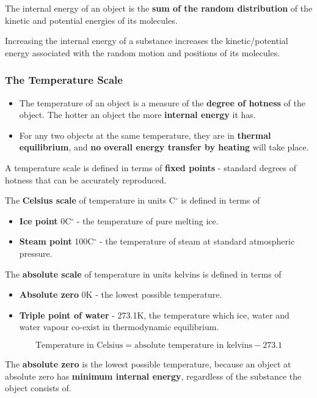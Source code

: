 The internal energy of an object is the \textbf{sum of the random distribution} of the kinetic and potential energies of its molecules.

Increasing the internal energy of a substance increases the kinetic/potential energy associated with the random motion and positions of its molecules.

\subsubsection*{The Temperature Scale}

\begin{itemize}
    \item The temperature of an object is a measure of the \textbf{degree of hotness} of the object. The hotter an object the more \textbf{internal energy} it has.
    \item For any two objects at the same temperature, they are in \textbf{thermal equilibrium}, and \textbf{no overall energy transfer by heating} will take place.
\end{itemize}

A temperature scale is defined in terms of \textbf{fixed points} - standard degrees of hotness that can be accurately reproduced.

The \textbf{Celsius scale} of temperature in units C$^\circ$ is defined in terms of
\begin{itemize}
    \item \textbf{Ice point} 0C$^\circ$ - the temperature of pure melting ice.
    \item \textbf{Steam point} 100C$^\circ$ - the temperature of steam at standard atmospheric pressure.
\end{itemize}

The \textbf{absolute scale} of temperature in units kelvins is defined in terms of
\begin{itemize}
    \item \textbf{Absolute zero} 0K - the lowest possible temperature.
    \item \textbf{Triple point of water} - 273.1K, the temperature which ice, water and water vapour co-exist in thermodynamic equilibrium.
\end{itemize}
$$\text{Temperature in Celsius}=\text{absolute temperature in kelvins}-273.1$$

The \textbf{absolute zero} is the lowest possible temperature, because an object at absolute zero has \textbf{minimum internal energy}, regardless of the substance the object consists of.
